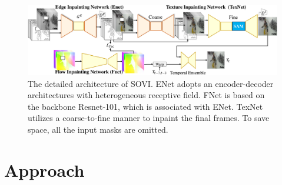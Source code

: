 \begin{figure}[t]
	\centering
	\includegraphics[width=2.0\columnwidth]{sti} %
	\caption{The detailed architecture of SOVI. ENet adopts an encoder-decoder architectures with heterogeneous receptive field.
	FNet is based on the backbone Resnet-101, which is associated with ENet. TexNet utilizes a coarse-to-fine manner to inpaint the final frames. To save space, all the input masks are omitted.}
	
	\label{fig:stiNet}
\end{figure}

\section{Approach}
\label{sec:approach}

